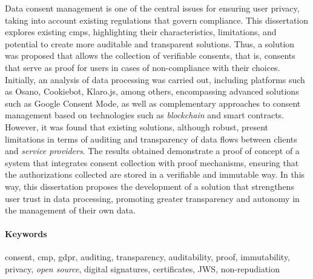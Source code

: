 Data consent management is one of the central issues for ensuring user privacy, taking into account existing regulations that govern compliance. This dissertation explores existing \acrfull{cmp}s, highlighting their characteristics, limitations, and potential to create more auditable and transparent solutions. 
Thus, a solution was proposed that allows the collection of verifiable consents, that is, consents that serve as proof for users in cases of non-compliance with their choices. Initially, an analysis of data processing was carried out, including platforms such as Osano, Cookiebot, Klaro.js, among others, encompassing advanced solutions such as Google Consent Mode, as well as complementary approaches to consent management based on technologies such as \textit{blockchain} and smart contracts. 
However, it was found that existing solutions, although robust, present limitations in terms of auditing and transparency of data flows between clients and \textit{service providers}. The results obtained demonstrate a proof of concept of a system that integrates consent collection with proof mechanisms, ensuring that the authorizations collected are stored in a verifiable and immutable way. 
In this way, this dissertation proposes the development of a solution that strengthens user trust in data processing, promoting greater transparency and autonomy in the management of their own data.

\paragraph{Keywords} consent, \acrshort{cmp}, \acrshort{gdpr}, auditing, transparency, auditability, proof, immutability, privacy, \textit{open source}, digital signatures, certificates, JWS, non-repudiation

\cleardoublepage

